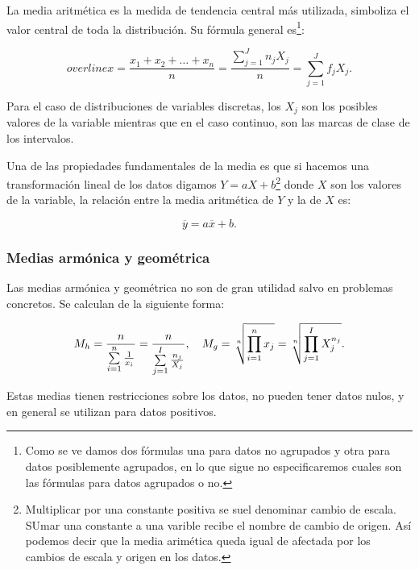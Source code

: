 \documentclass[12pt]{report}
\begin{document}
 La media aritmética  es la medida de tendencia central más utilizada,
simboliza el valor central de toda la distribución. Su fórmula general es\footnote{Como
se ve damos dos fórmulas una para datos no agrupados y otra para datos posiblemente
agrupados, en lo que sigue no especificaremos  cuales son las fórmulas para datos
agrupados o no.}:

$$overline{x}=\frac{x_1 + x_2 +\ldots +
x_n}{n}=\frac{\sum\limits_{j=1}^{J} n_j X_j}{n}=\sum\limits_{j=1}^{J} f_j X_j.$$


Para el caso de distribuciones de variables discretas, los $X_j$ son los posibles valores de la
variable mientras que  en el caso continuo, son las marcas de clase de los intervalos.

Una de las propiedades fundamentales de la media es que si  hacemos una transformación lineal
de los datos digamos $Y=aX+b$\footnote{Multiplicar por una constante positiva se suel denominar cambio de escala. SUmar una constante a una varible recibe el nombre de cambio de origen. Así podemos decir que la media arimética queda igual de afectada por  los cambios de escala y origen en los datos.} donde $X$ son los valores de la variable, la relación
entre la media aritmética de $Y$ y la de $X$ es:

$$ \overline{y}=a \overline{x} +b.$$

\subsubsection{Medias armónica y geométrica}

Las medias armónica y geométrica no son de gran utilidad salvo en problemas concretos. Se
calculan de la siguiente forma:

\[ M_{h}=\frac{n}{\sum\limits_{i=1}^{n} \frac{1}{x_i}}=\frac{n}{\sum\limits_{j=1}^{I} \frac{n_j}{X_j}}, \quad  M_g
=\root n\of{\prod_{i=1}^{n} x_j} =\root n\of{\prod_{j=1}^{I} X_j^{n_j}}.\]


Estas medias tienen restricciones sobre los datos, no pueden tener datos nulos, y en
general se utilizan para datos positivos.
\end{document}
